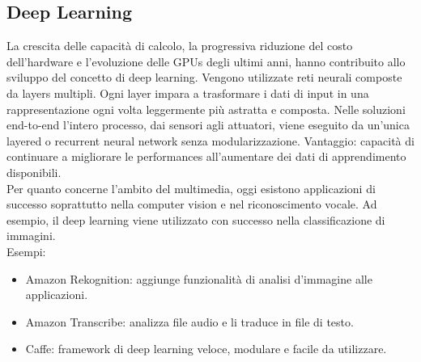 \documentclass[8pt,a4paper]{article}
\begin{document}
\begin{multicols}{5}
    \subsection{Deep Learning}
    La crescita delle capacità di calcolo, la progressiva riduzione del costo dell’hardware
    e l’evoluzione delle GPUs degli ultimi anni, hanno contribuito allo sviluppo del concetto
    di deep learning. Vengono utilizzate reti neurali composte da layers multipli. Ogni layer
    impara a trasformare i dati di input in una rappresentazione ogni volta leggermente più
    astratta e composta. Nelle soluzioni end-to-end l’intero processo, dai sensori agli attuatori,
    viene eseguito da un’unica layered o recurrent neural network senza modularizzazione.
    Vantaggio: capacità di continuare a migliorare le performances all’aumentare dei dati di
    apprendimento disponibili.\\
    Per quanto concerne l’ambito del multimedia, oggi esistono applicazioni di successo soprattutto
    nella computer vision e nel riconoscimento vocale. Ad esempio, il deep learning viene utilizzato
    con successo nella classificazione di immagini.\\
    Esempi:
    \begin{itemize}
    \item Amazon Rekognition: aggiunge funzionalità di analisi d’immagine alle applicazioni.
    \item Amazon Transcribe: analizza file audio e li traduce in file di testo.
    \item Caffe: framework di deep learning veloce, modulare e facile da utilizzare.
    \end{itemize}
\end{multicols}
\end{document}

